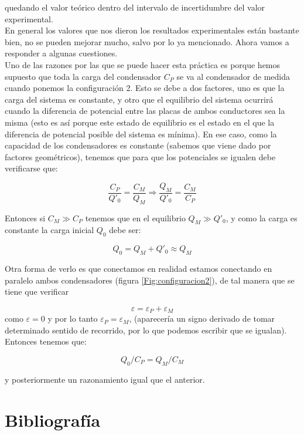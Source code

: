 \documentclass[12pt,a4paper]{article}
\begin{document}
quedando el valor teórico dentro del intervalo de incertidumbre del valor experimental. \\

En general los valores que nos dieron los resultados experimentales están bastante bien, no se pueden mejorar mucho, salvo por lo ya mencionado. Ahora vamos a responder a algunas cuestiones. \\

Uno de las razones por las que se puede hacer esta práctica es porque hemos supuesto que toda la carga del condensador $C_P$ se va al condensador de medida cuando ponemos la configuración 2. Esto se debe a dos factores, uno es que la carga del sistema es constante, y otro que el equilibrio del sistema ocurrirá cuando la diferencia de potencial entre las placas de ambos conductores sea la misma (esto es así porque este estado de equilibrio es el estado en el que la diferencia de potencial posible del sistema es mínima). En ese caso, como la capacidad de los condensadores es constante (sabemos que viene dado por factores geométricos), tenemos que para que los potenciales se igualen debe verificarse que:

\begin{equation}
\dfrac{C_P}{Q'_0}=\dfrac{C_M}{Q_M} \Longrightarrow \dfrac{Q_M}{Q'_{0}}=\dfrac{C_M}{C_P}
\end{equation} 

Entonces si $C_M \gg C_P$ tenemos que en el equilibrio $Q_M \gg Q'_0$, y como la carga es constante la carga inicial $Q_{0}$ debe ser:

\begin{equation}
Q_0 = Q_M + Q'_0 \approx Q_M
\end{equation}

Otra forma de verlo es que conectamos en realidad estamos conectando en paralelo ambos condensadores (figura \ref{Fig:configuracion2}), de tal manera que se tiene que verificar 

\begin{equation}
\varepsilon = \varepsilon_P + \varepsilon_M
\end{equation}
como $\varepsilon = 0 $ y por lo tanto $\varepsilon_P = \varepsilon_M$, (aparecería un signo derivado de tomar determinado sentido de recorrido, por lo que podemos escribir que se igualan). Entonces tenemos que:

$$ Q_0 / C_P = Q_M / C_M $$

y posteriormente un razonamiento igual que el anterior.


\section{Bibliografía} \label{Sec:7}
\end{document}
